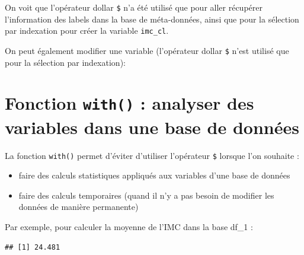 \documentclass[
]{book}
\newenvironment{Shaded}{\begin{snugshade}}{\end{snugshade}}
\newcommand{\CommentTok}[1]{\textcolor[rgb]{0.56,0.35,0.01}{\textit{#1}}}
\newcommand{\DecValTok}[1]{\textcolor[rgb]{0.00,0.00,0.81}{#1}}
\newcommand{\DocumentationTok}[1]{\textcolor[rgb]{0.56,0.35,0.01}{\textbf{\textit{#1}}}}
\newcommand{\FunctionTok}[1]{\textcolor[rgb]{0.13,0.29,0.53}{\textbf{#1}}}
\newcommand{\NormalTok}[1]{#1}
\newcommand{\OtherTok}[1]{\textcolor[rgb]{0.56,0.35,0.01}{#1}}
\newcommand{\SpecialCharTok}[1]{\textcolor[rgb]{0.81,0.36,0.00}{\textbf{#1}}}
\providecommand{\tightlist}{%
  \setlength{\itemsep}{0pt}\setlength{\parskip}{0pt}}
\begin{document}
On voit que l'opérateur dollar \texttt{\$} n'a été utilisé que pour aller récupérer l'information des labels dans la base de méta-données, ainsi que pour la sélection par indexation pour créer la variable \texttt{imc\_cl}.

On peut également modifier une variable (l'opérateur dollar \texttt{\$} n'est utilisé que pour la sélection par indexation):

\begin{Shaded}
\end{Shaded}

\section{\texorpdfstring{Fonction \texttt{with()} : analyser des variables dans une base de données}{Fonction with() : analyser des variables dans une base de données}}\label{fonction-with-analyser-des-variables-dans-une-base-de-donnuxe9es}

La fonction \texttt{with()} permet d'éviter d'utiliser l'opérateur \texttt{\$} lorsque l'on souhaite :

\begin{itemize}
\tightlist
\item
  faire des calculs statistiques appliqués aux variables d'une base de données
\item
  faire des calculs temporaires (quand il n'y a pas besoin de modifier les données de manière permanente)
\end{itemize}

Par exemple, pour calculer la moyenne de l'IMC dans la base df\_1 :

\begin{Shaded}
\end{Shaded}

\begin{verbatim}
## [1] 24.481
\end{verbatim}
\end{document}
